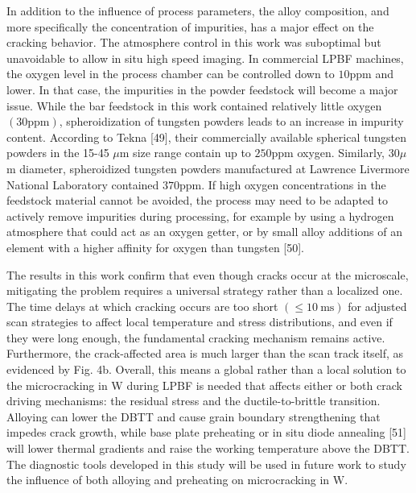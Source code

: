 \documentclass[10pt]{article}
\begin{document}
In addition to the influence of process parameters, the alloy composition, and more specifically the concentration of impurities, has a major effect on the cracking behavior. The atmosphere control in this work was suboptimal but unavoidable to allow in situ high speed imaging. In commercial LPBF machines, the oxygen level in the process chamber can be controlled down to $10 \mathrm{ppm}$ and lower. In that case, the impurities in the powder feedstock will become a major issue. While the bar feedstock in this work contained relatively little oxygen $(30 \mathrm{ppm})$, spheroidization of tungsten powders leads to an increase in impurity content. According to Tekna [49], their commercially available spherical tungsten powders in the 15-45 $\mu \mathrm{m}$ size range contain up to $250 \mathrm{ppm}$ oxygen. Similarly, $30 \mu$ m diameter, spheroidized tungsten powders manufactured at Lawrence Livermore National Laboratory contained $370 \mathrm{ppm}$. If high oxygen concentrations in the feedstock material cannot be avoided, the process may need to be adapted to actively remove impurities during processing, for example by using a hydrogen atmosphere that could act as an oxygen getter, or by small alloy additions of an element with a higher affinity for oxygen than tungsten [50].

The results in this work confirm that even though cracks occur at the microscale, mitigating the problem requires a universal strategy rather than a localized one. The time delays at which cracking occurs are too short $(\leq 10 \mathrm{~ms})$ for adjusted scan strategies to affect local temperature and stress distributions, and even if they were long enough, the fundamental cracking mechanism remains active. Furthermore, the crack-affected area is much larger than the scan track itself, as evidenced by Fig. 4b. Overall, this means a global rather than a local solution to the microcracking in W during LPBF is needed that affects either or both crack driving mechanisms: the residual stress and the ductile-to-brittle transition. Alloying can lower the DBTT and cause grain boundary strengthening that impedes crack growth, while base plate preheating or in situ diode annealing [51] will lower thermal gradients and raise the working temperature above the DBTT. The diagnostic tools developed in this study will be used in future work to study the influence of both alloying and preheating on microcracking in $\mathrm{W}$.
\end{document}

